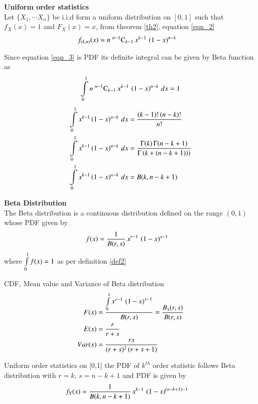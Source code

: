\documentclass[journal,12pt,twocolumn]{IEEEtran}
\begin{document}
\begin{definition}
\textbf{Uniform order statistics} \\
Let $\{X_1,\cdots X_n\}$ be i.i.d form a uniform distribution on $[0,1]$ such that $f_{X}(x) = 1$ and $F_{X}(x)=x$,
from theorem \eqref{th2}, equation \eqref{eqn_2}
\begin{align}
f_{(k,n)}(x) &= n\;{}^{n-1}\mathrm{C}_{k-1}\,x^{k-1}\,\left(1-x\right)^{n-k}\label{eqn_3}
\end{align}
\end{definition}
\begin{lemma}
\label{lma1}
Since equation \eqref{eqn_3} is PDF its definite integral can be given by Beta function as
\begin{equation}
 \int\limits_{0}^{1} n\;{}^{n-1}\mathrm{C}_{k-1}\,x^{k-1}\,\left(1-x\right)^{n-k} \,dx  = 1    
\end{equation}
\begin{align}
\int\limits_{0}^{1} x^{k-1}\left(1-x\right)^{n-k} \,dx  &= \dfrac{(k-1)!\,(n-k)!}{n!}  \\
\int\limits_{0}^{1} x^{k-1}\left(1-x\right)^{n-k} \,dx  &= \dfrac{\Gamma(k)\,\Gamma(n-k+1)}{\Gamma\left(k+(n-k+1))\right)} \\
\int\limits_{0}^{1} x^{k-1}\left(1-x\right)^{n-k} \,dx  &= B(k,n-k+1)
\end{align}
\end{lemma}
\newpage
\begin{definition}
\label{bddef}
\textbf{Beta Distribution} \\
The Beta distribution is a continuous distribution defined on the range $(0,1)$ whose PDF given by 
\begin{align}
f(x) &= \dfrac{1}{B(r,s)}\,x^{r-1}\,\left(1-x\right)^{s-1} 
\end{align}
where $\int\limits_{0}^1f(x) = 1$ as per definition \eqref{def2} 

CDF, Mean value and Variance of Beta distribution
\begin{align}
 F(x)   &=\dfrac{\int\limits_{0}^{x}x^{r-1}\,\left(1-x\right)^{s-1}}{B(r,s)} =    \dfrac{B_{x}(r,s)}{B(r,s)} \\
 E(x)   &=   \dfrac{r}{r+s} \\
 Var(x) &= \dfrac{rs}{(r+s)^{2}\,(r+s+1)}
\end{align}
\end{definition}
\begin{lemma}
Uniform order statistics on [0,1] the PDF of $k^{th}$ order statistic follows Beta distribution with $r=k$, $s=n-k+1$
and  PDF is given by 
\begin{align}
f_{X}(x) &= \dfrac{1}{B(k,n-k+1)}\,x^{k-1}\,\left(1-x\right)^{(n-k+1)-1} 
\end{align}
\end{lemma}
\end{document}
